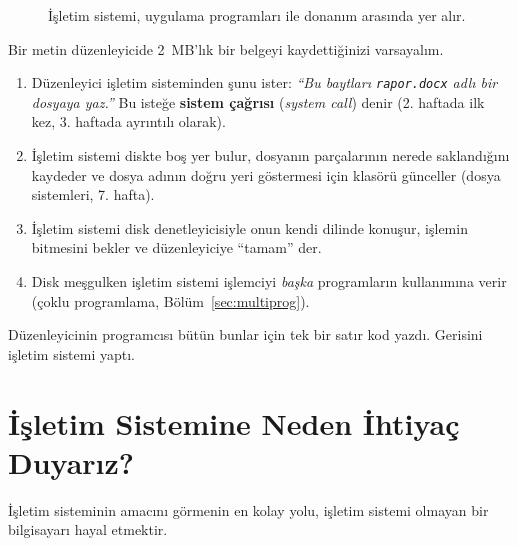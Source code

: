 \documentclass[11pt,a4paper]{article}
\newcommand{\term}[1]{\textbf{\color{mintdeep}#1}}
\newcommand{\cmd}[1]{\texttt{#1}}
\begin{document}
\begin{figure}[H]
\centering
{}
\caption{İşletim sistemi, uygulama programları ile donanım arasında yer alır.}
\label{fig:layers}
\end{figure}

\begin{example}
Bir metin düzenleyicide 2~MB'lık bir belgeyi kaydettiğinizi varsayalım.
\begin{enumerate}[leftmargin=1.4em]
  \item Düzenleyici işletim sisteminden şunu ister: \emph{``Bu baytları \cmd{rapor.docx} adlı bir dosyaya yaz.''} Bu isteğe \term{sistem çağrısı} (\emph{system call}) denir (2. haftada ilk kez, 3. haftada ayrıntılı olarak).
  \item İşletim sistemi diskte boş yer bulur, dosyanın parçalarının nerede saklandığını kaydeder ve dosya adının doğru yeri göstermesi için klasörü günceller (dosya sistemleri, 7. hafta).
  \item İşletim sistemi disk denetleyicisiyle onun kendi dilinde konuşur, işlemin bitmesini bekler ve düzenleyiciye ``tamam'' der.
  \item Disk meşgulken işletim sistemi işlemciyi \emph{başka} programların kullanımına verir (çoklu programlama, Bölüm~\ref{sec:multiprog}).
\end{enumerate}
Düzenleyicinin programcısı bütün bunlar için tek bir satır kod yazdı. Gerisini işletim sistemi yaptı.
\end{example}

\section{İşletim Sistemine Neden İhtiyaç Duyarız?}

İşletim sisteminin amacını görmenin en kolay yolu, işletim sistemi olmayan bir bilgisayarı hayal etmektir.
\end{document}
